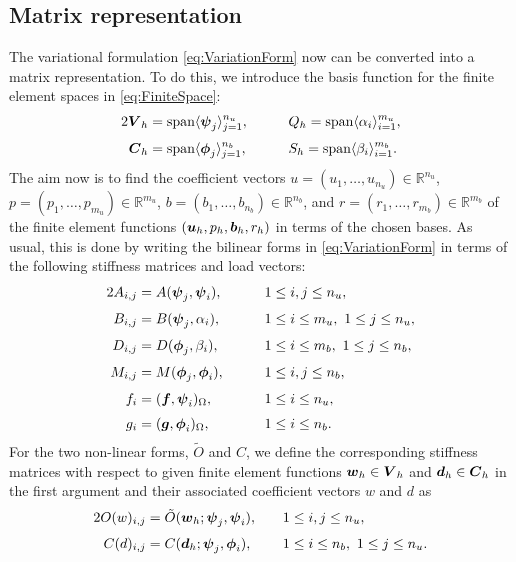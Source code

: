 \subsection{Matrix representation}

The variational formulation \eqref{eq:VariationForm} now can be converted into a matrix representation. To do this, we introduce the basis function for the finite element spaces in \eqref{eq:FiniteSpace}:
\begin{alignat}2
\label{eq:bases1}
\uu{V}_h & = \mbox{span}\langle  \uu{\psi}_j \rangle _{j=1}^{n_u}, & \qquad &
Q_h  = \mbox{span} \langle  \alpha_i \rangle _{i=1}^{m_u},\\[0.1cm]
 \uu{C}_h& =\mbox{span}\langle \uu{\phi}_j \rangle _{j=1}^{n_b}, & \qquad & S_h = \mbox{span} \langle \beta_i
\rangle_{i=1}^{m_b}.
\end{alignat}
The aim now is to find the coefficient vectors $u = (u_1, \ldots , u_{n_u}) \in \mathbb{R}^{n_u}$, $p = (p_1, \ldots , p_{m_u}) \in \mathbb{R}^{m_u}$, $b = (b_1, \ldots , b_{n_b}) \in \mathbb{R}^{n_b}$, and $r = (r_1, \ldots , r_{m_b}) \in \mathbb{R}^{m_b}$ of the finite element functions $(\boldsymbol u_h, p_h,\boldsymbol b_h, r_h)$ in terms of the chosen bases. As usual, this is done by writing the bilinear forms in \eqref{eq:VariationForm} in terms of the following stiffness matrices and load vectors:
\begin{alignat*}2
A_{i,j} &= A(\uu{\psi}_j,\uu{\psi}_i), &\quad  &1 \leq i,j \leq n_u,\\[0.1cm]
B_{i,j} &= B(\uu{\psi}_j,\alpha_i), &\quad &1 \leq i \leq m_u, \ 1 \leq j \leq n_u,\\[.1cm]
D_{i,j} &= D(\uu{\phi}_j,\beta_i),  & & 1 \leq i \leq m_b,\ 1 \leq j \leq n_b,\\[.1cm]
M_{i,j}&= M(\uu{\phi}_j,\uu{\phi}_i), &\qquad & 1 \leq i,j \leq n_b,\\[.1cm]
f_i &= (\uu{f},\uu{\psi}_i)_\Omega, & & 1\leq i\leq n_u,\\[.1cm]
g_i &= (\uu{g},\uu{\phi}_i)_\Omega, & & 1\leq i \leq n_b.
\end{alignat*}
For the two non-linear forms, $\tilde{O}$ and $C$, we define the corresponding stiffness matrices with respect to given finite element functions $\boldsymbol w_h \in \boldsymbol V_h$ and $\boldsymbol d_h\in \boldsymbol C_h$ in the first argument and their associated coefficient vectors $w$ and $d$ as
\begin{alignat*}2
O(w)_{i,j} &=\tilde{O}(\uu{w}_h;\uu{\psi}_j,\uu{\psi}_i), &\quad  &1 \leq i,j \leq n_u,\\[.1cm]
C(d)_{i,j} &= C(\uu{d}_h;\uu{\psi}_j,\uu{\phi}_i), & & 1\leq i \leq n_b,\ 1 \leq j \leq n_u.
\end{alignat*}

